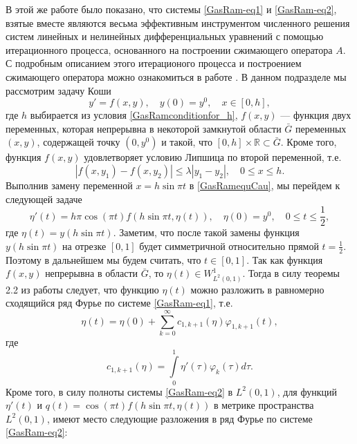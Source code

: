 В этой же работе было показано, что системы \eqref{GasRam-eq1} и \eqref{GasRam-eq2}, взятые вместе являются весьма эффективным инструментом численного решения систем линейных и нелинейных дифференциальных уравнений с помощью итерационного процесса, основанного на построении сжимающего оператора $A$. С подробным описанием этого итерационого процесса и построением сжимающего оператора можно ознакомиться в работе \cite{RamSharDemr}. В данном подразделе мы рассмотрим задачу Коши
\begin{equation}\label{GasRamequCau}
y{'} = f(x,y), \quad y(0) = y^0, \quad x \in [0, h],
\end{equation}
где $h$ выбирается из условия \eqref{GasRamconditionfor_h}, $f(x,y)$ --- функция двух переменных, которая непрерывна в некоторой замкнутой области $\bar{G}$ переменных $(x,y)$, содержащей точку $(0,y^0)$ и такой, что  $[0,h]\times\mathbb{R}\subset\bar G$.
Кроме того, функция $f(x,y)$ удовлетворяет условию Липшица по второй переменной, т.е.
\begin{equation*}
 \left|f(x,y_{1})-f(x,y_{2})\right|\leq\lambda\left|y_{1}-y_{2}\right|,\quad0\leq x\leq h.
\end{equation*}
Выполнив замену переменной $x = h\sin \pi t$ в \eqref{GasRamequCau}, мы перейдем к следующей задаче
\begin{equation}\label{GasRamequafterrep}
\eta{'}(t) = h\pi \cos(\pi t) f(h\sin \pi t, \eta(t)), \quad \eta(0) = y^0, \quad 0 \leq t \leq \frac{1}{2},
\end{equation}
где
$\eta(t)=y(h\sin \pi t)$. Заметим, что после такой замены функция $y(h\sin \pi t)$ на отрезке $[0,1]$ будет симметричной относительно прямой $t=\frac{1}{2}$. Поэтому в дальнейшем мы будем считать, что $t\in[0,1]$.
Так как функция $f(x,y)$ непрерывна в области $\bar{G}$, то $\eta(t)\in W^1_{L^2(0,1)}$. Тогда в силу теоремы 2.2 из работы \cite{RamShaIzv} следует, что функцию  $\eta(t)$ можно разложить в равномерно сходящийся ряд Фурье по системе \eqref{GasRam-eq1}, т.е.
\begin{equation}\label{GasRamFourierserforg}
\eta(t) = \eta(0)+\sum_{k=0}^\infty c_{1,k+1}(\eta)\varphi_{1,k+1}(t),
\end{equation}
где
$$
c_{1,k+1}(\eta)=\int\limits_0^1\eta{'}(\tau)\varphi_k(\tau)d\tau.
$$
Кроме того, в силу полноты системы \eqref{GasRam-eq2} в $L^2(0,1)$, для функций $\eta{'}(t)$ и \linebreak$q(t)=\cos(\pi t) f(h\sin \pi t, \eta(t))$ в метрике пространства $L^2(0,1)$, имеют место следующие разложения в ряд Фурье по системе \eqref{GasRam-eq2}:
